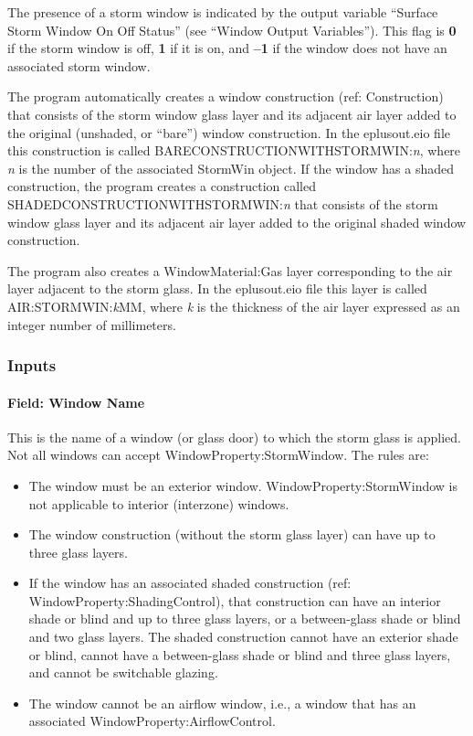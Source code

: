 The presence of a storm window is indicated by the output variable ``Surface Storm Window On Off Status'' (see ``Window Output Variables''). This flag is \textbf{0} if the storm window is off, \textbf{1} if it is on, and \textbf{--1} if the window does not have an associated storm window.

The program automatically creates a window construction (ref: Construction) that consists of the storm window glass layer and its adjacent air layer added to the original (unshaded, or ``bare'') window construction. In the eplusout.eio file this construction is called BARECONSTRUCTIONWITHSTORMWIN:\emph{n}, where \emph{n} is the number of the associated StormWin object. If the window has a shaded construction, the program creates a construction called SHADEDCONSTRUCTIONWITHSTORMWIN:\emph{n} that consists of the storm window glass layer and its adjacent air layer added to the original shaded window construction.

The program also creates a WindowMaterial:Gas layer corresponding to the air layer adjacent to the storm glass. In the eplusout.eio file this layer is called AIR:STORMWIN:\emph{k}MM, where \emph{k} is the thickness of the air layer expressed as an integer number of millimeters.

\subsubsection{Inputs}\label{inputs-35-001}

\paragraph{Field: Window Name}\label{field-window-name-000}

This is the name of a window (or glass door) to which the storm glass is applied. Not all windows can accept WindowProperty:StormWindow. The rules are:

\begin{itemize}
\item
  The window must be an exterior window. WindowProperty:StormWindow is not applicable to interior (interzone) windows.
\item
  The window construction (without the storm glass layer) can have up to three glass layers.
\item
  If the window has an associated shaded construction (ref: WindowProperty:ShadingControl), that construction can have an interior shade or blind and up to three glass layers, or a between-glass shade or blind and two glass layers. The shaded construction cannot have an exterior shade or blind, cannot have a between-glass shade or blind and three glass layers, and cannot be switchable glazing.
\item
  The window cannot be an airflow window, i.e., a window that has an associated WindowProperty:AirflowControl.
\end{itemize}

